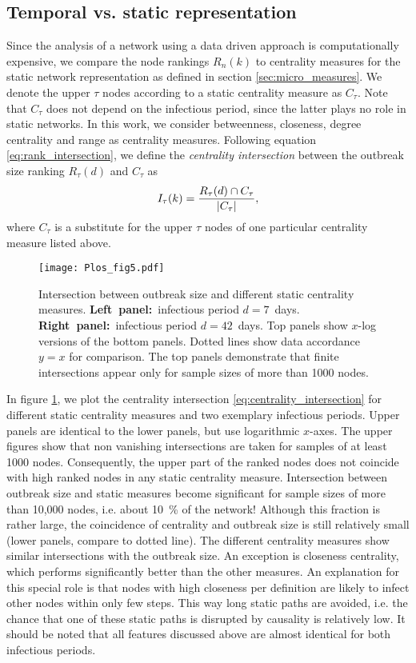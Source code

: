 \subsection{Temporal vs. static representation}
Since the analysis of a network using a data driven approach is computationally expensive, we compare the node rankings $R_n(k)$ to centrality measures for the static network representation as defined in section \ref{sec:micro_measures}.
We denote the upper $\tau $ nodes according to a static centrality measure as $C_\tau $.
Note that $C_\tau $ does not depend on the infectious period, since the latter plays no role in static networks.
In this work, we consider betweenness, closeness, degree centrality and range as centrality measures.
Following equation \eqref{eq:rank_intersection}, we define the \emph{centrality intersection} between the outbreak size ranking $R_\tau (d)$ and $C_\tau $ as
\begin{equation}\label{eq:centrality_intersection}
I_\tau (k)=\frac{R_\tau (d) \cap C_\tau}{\left| C_\tau \right|},
\end{equation}
where $C_\tau $ is a substitute for the upper $\tau $ nodes of one particular centrality measure listed above.
%
\begin{figure}[htb]
\begin{center}
\texttt{[image: Plos\_fig5.pdf]}
\caption{Intersection between outbreak size and different static centrality measures.
\textbf{Left~panel:}~infectious period $d=7$~days.
\textbf{Right~panel:}~infectious period $d=42$~days.
Top panels show $x$-log versions of the bottom panels. 
Dotted lines show data accordance $y=x$ for comparison.
The top panels demonstrate that finite intersections appear only for sample sizes of more than 1000 nodes.}
\label{fig:plos_fig5}
\end{center}
\end{figure}

In figure \ref{fig:plos_fig5}, we plot the centrality intersection \eqref{eq:centrality_intersection} for different static centrality measures and two exemplary infectious periods.
Upper panels are identical to the lower panels, but use logarithmic $x$-axes. 
The upper figures show that non vanishing intersections are taken for samples of at least 1000 nodes.
Consequently, the upper part of the ranked nodes does not coincide with high ranked nodes in any static centrality measure.
Intersection between outbreak size and static measures become significant for sample sizes of more than 10,000 nodes, i.e. about 10~\% of the network!
Although this fraction is rather large, the coincidence of centrality and outbreak size is still relatively small (lower panels, compare to dotted line).
The different centrality measures show similar intersections with the outbreak size.
An exception is closeness centrality, which performs significantly better than the other measures.
An explanation for this special role is that nodes with high closeness per definition are likely to infect other nodes within only few steps.
This way long static paths are avoided, i.e. the chance that one of these static paths is disrupted by causality is relatively low.
It should be noted that all features discussed above are almost identical for both infectious periods.

